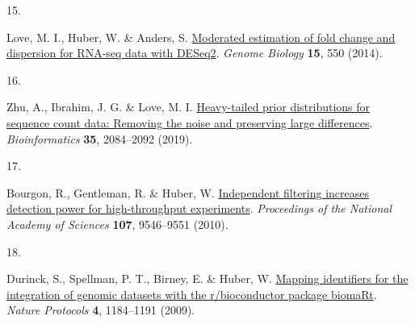 \documentclass[
]{article}
\newlength{\cslhangindent}
\newlength{\csllabelwidth}
\newenvironment{CSLReferences}[2] %
 {\begin{list}{}{%
  \setlength{\itemindent}{0pt}
  \setlength{\leftmargin}{0pt}
  \setlength{\parsep}{0pt}
  \ifodd #1
   \setlength{\leftmargin}{\cslhangindent}
   \setlength{\itemindent}{-1\cslhangindent}
  \fi
  \setlength{\itemsep}{#2\baselineskip}}}
 {\end{list}}
\newcommand{\CSLLeftMargin}[1]{\parbox[t]{\csllabelwidth}{\strut#1\strut}}
\newcommand{\CSLRightInline}[1]{\parbox[t]{\linewidth - \csllabelwidth}{\strut#1\strut}}
\begin{document}
\begin{CSLReferences}{0}{0}
\CSLLeftMargin{15. }%
\CSLRightInline{Love, M. I., Huber, W. \& Anders, S.
\href{https://doi.org/10.1186/s13059-014-0550-8}{Moderated estimation of
fold change and dispersion for RNA-seq data with DESeq2}. \emph{Genome
Biology} \textbf{15}, 550 (2014).}

\CSLLeftMargin{16. }%
\CSLRightInline{Zhu, A., Ibrahim, J. G. \& Love, M. I.
\href{https://doi.org/10.1093/bioinformatics/bty895}{Heavy-tailed prior
distributions for sequence count data: Removing the noise and preserving
large differences}. \emph{Bioinformatics} \textbf{35}, 2084--2092
(2019).}

\CSLLeftMargin{17. }%
\CSLRightInline{Bourgon, R., Gentleman, R. \& Huber, W.
\href{https://doi.org/10.1073/pnas.0914005107}{Independent filtering
increases detection power for high-throughput experiments}.
\emph{Proceedings of the National Academy of Sciences} \textbf{107},
9546--9551 (2010).}

\CSLLeftMargin{18. }%
\CSLRightInline{Durinck, S., Spellman, P. T., Birney, E. \& Huber, W.
\href{https://doi.org/10.1038/nprot.2009.97}{Mapping identifiers for the
integration of genomic datasets with the r/bioconductor package
biomaRt}. \emph{Nature Protocols} \textbf{4}, 1184--1191 (2009).}

\end{CSLReferences}
\end{document}
